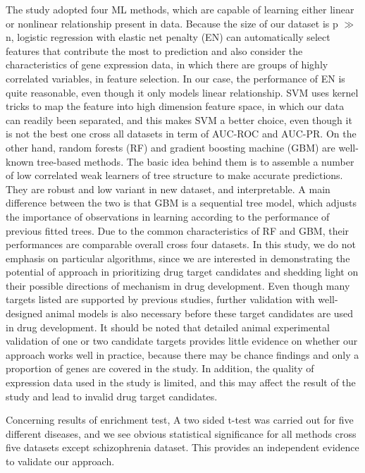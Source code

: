   The study adopted four ML methods, which are capable of learning either linear or nonlinear relationship present in data. Because the size of our dataset is p $\gg$ n, logistic regression with elastic net penalty (EN) can automatically select features that contribute the most to prediction and also consider the characteristics of gene expression data, in which there are groups of highly correlated variables, in feature selection. In our case, the performance of EN is quite reasonable, even though it only models linear relationship. SVM uses kernel tricks to map the feature into high dimension feature space, in which our data can readily been separated, and this makes SVM a better choice, even though it is not the best one cross all datasets in term of AUC-ROC and AUC-PR. On the other hand, random forests (RF) and gradient boosting machine (GBM) are well-known tree-based methods. The basic idea behind them is to assemble a number of low correlated weak learners of tree structure to make accurate predictions. They are robust and low variant in new dataset, and interpretable. A main difference between the two is that GBM is a sequential tree model, which adjusts the importance of observations in learning according to the performance of previous fitted trees. Due to the common characteristics of RF and GBM, their performances are comparable overall cross four datasets. In this study, we do not emphasis on particular algorithms, since we are interested in demonstrating the potential of approach in prioritizing drug target candidates and shedding light on their possible directions of mechanism in drug development. Even though many targets listed are supported by previous studies, further validation with well-designed animal models is also necessary before these target candidates are used in drug development. It should be noted that detailed animal experimental validation of one or two candidate targets provides little evidence on whether our approach works well in practice, because there may be chance findings and only a proportion of genes are covered in the study. In addition, the quality of expression data used in the study is limited, and this may affect the result of the study and lead to invalid drug target candidates.
  
  Concerning results of enrichment test, A two sided t-test was carried out for five different diseases, and we see obvious statistical significance for all methods cross five datasets except schizophrenia dataset. This provides an independent evidence to validate our approach.

